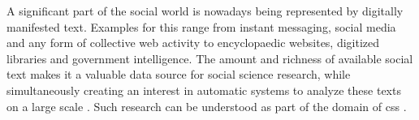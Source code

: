 \documentclass[11pt]{scrreprt}
\let\cite\parencite  %
\begin{document}
%
%
%
%
%
%
%
%
%
A significant part of the social world is nowadays being represented by digitally manifested text. Examples for this range from instant messaging, social media and any form of collective web activity to encyclopaedic websites, digitized libraries and government intelligence. The amount and richness of available social text makes it a valuable data source for social science research, while simultaneously creating an interest in automatic systems to analyze these texts on a large scale \cite{evansMachineTranslationMining2016}. Such research can be understood as part of the domain of \gls{css} \cite{lazerComputationalSocialScience2009}.
\end{document}
